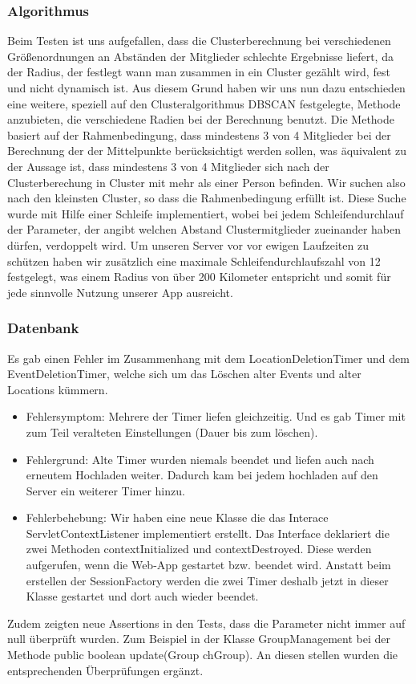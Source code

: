 \documentclass{scrartcl}
\begin{document}
\subsubsection{Algorithmus}
Beim Testen ist uns aufgefallen, dass die Clusterberechnung bei verschiedenen Größenordnungen an Abständen der Mitglieder schlechte Ergebnisse  liefert, da der Radius, der festlegt wann man zusammen in ein Cluster gezählt wird, fest und nicht dynamisch ist. Aus diesem Grund haben wir uns nun dazu entschieden eine weitere, speziell auf den Clusteralgorithmus DBSCAN festgelegte, Methode anzubieten, die verschiedene Radien bei der Berechnung benutzt. Die Methode basiert auf der Rahmenbedingung, dass mindestens 3 von 4 Mitglieder bei der Berechnung der der Mittelpunkte berücksichtigt werden sollen, was äquivalent zu der Aussage ist, dass mindestens 3 von 4 Mitglieder sich nach der Clusterberechung in Cluster mit mehr als einer Person befinden. Wir suchen also nach den kleinsten Cluster, so dass die Rahmenbedingung erfüllt ist. Diese Suche wurde mit Hilfe einer Schleife implementiert, wobei bei jedem Schleifendurchlauf der Parameter, der angibt welchen Abstand Clustermitglieder zueinander haben dürfen, verdoppelt wird. Um unseren Server vor vor ewigen Laufzeiten zu schützen haben wir zusätzlich eine maximale Schleifendurchlaufszahl von 12 festgelegt, was einem Radius von über 200 Kilometer entspricht und somit für jede sinnvolle Nutzung unserer App ausreicht.
\subsubsection{Datenbank}
Es gab einen Fehler im Zusammenhang mit dem LocationDeletionTimer und dem EventDeletionTimer, welche sich um das Löschen alter Events und alter Locations kümmern.
\begin{itemize} 
\item Fehlersymptom:
Mehrere der Timer liefen gleichzeitig. Und es gab Timer mit zum Teil veralteten Einstellungen (Dauer bis zum löschen).
\item Fehlergrund:
Alte Timer wurden niemals beendet und liefen auch nach erneutem Hochladen weiter. Dadurch kam bei jedem hochladen auf den Server ein weiterer Timer hinzu.
\item Fehlerbehebung:
Wir haben eine neue Klasse die das Interace ServletContextListener implementiert erstellt. Das Interface deklariert die zwei Methoden contextInitialized und contextDestroyed. Diese werden aufgerufen, wenn die Web-App gestartet bzw. beendet wird.
Anstatt beim erstellen der SessionFactory werden die zwei Timer deshalb jetzt in dieser Klasse gestartet und dort auch wieder beendet.
\end{itemize}
Zudem zeigten neue Assertions in den Tests, dass die Parameter nicht immer auf null überprüft wurden. Zum Beispiel in der Klasse GroupManagement bei der Methode public boolean update(Group chGroup). An diesen stellen wurden die entsprechenden Überprüfungen ergänzt.\newline
\end{document}

